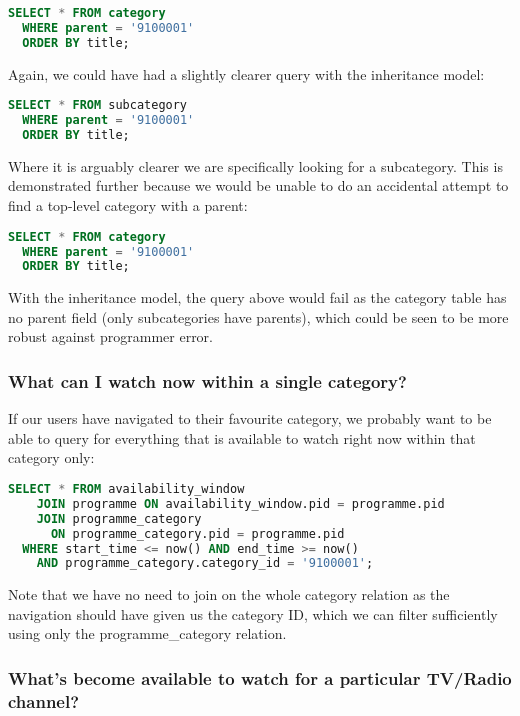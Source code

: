 \documentclass[11pt,a4paper]{article}
\begin{document}
\begin{lstlisting}[language=SQL]
  SELECT * FROM category
  WHERE parent = '9100001'
  ORDER BY title;
\end{lstlisting}

Again, we could have had a slightly clearer query with the inheritance
model:

\begin{lstlisting}[language=SQL]
  SELECT * FROM subcategory
  WHERE parent = '9100001'
  ORDER BY title;
\end{lstlisting}

Where it is arguably clearer we are specifically looking for a subcategory.
This is demonstrated further because we would be unable to do an accidental
attempt to find a top-level category with a parent:

\begin{lstlisting}[language=SQL]
  SELECT * FROM category
  WHERE parent = '9100001'
  ORDER BY title;
\end{lstlisting}

With the inheritance model, the query above would fail as the category
table has no parent field (only subcategories have parents), which
could be seen to be more robust against programmer error.

\subsubsection{What can I watch now within a single category?}

If our users have navigated to their favourite category, we probably want
to be able to query for everything that is available to watch right
now within that category only:

\begin{lstlisting}[language=SQL]
  SELECT * FROM availability_window
    JOIN programme ON availability_window.pid = programme.pid
    JOIN programme_category
      ON programme_category.pid = programme.pid
  WHERE start_time <= now() AND end_time >= now()
    AND programme_category.category_id = '9100001';
\end{lstlisting}

Note that we have no need to join on the whole category relation as the
navigation should have given us the category ID, which we can filter
sufficiently using only the programme\_category relation.

\subsubsection{What's become available to watch for a particular TV/Radio channel?}
\end{document}
